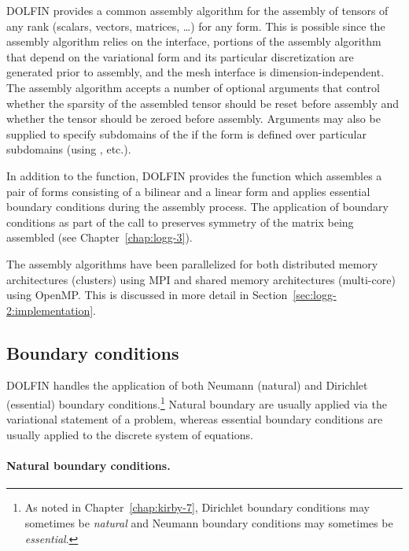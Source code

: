 DOLFIN provides a common assembly algorithm for the assembly of tensors
of any rank (scalars, vectors, matrices, \ldots) for any form. This is
possible since the assembly algorithm relies on the 
interface, portions of the assembly algorithm that depend on the
variational form and its particular discretization are generated prior to
assembly, and the mesh interface is dimension-independent.  The assembly
algorithm accepts a number of optional arguments that control whether
the sparsity of the assembled tensor should be reset before assembly
and whether the tensor should be zeroed before assembly. Arguments may
also be supplied to specify subdomains of the  if the form is
defined over particular subdomains (using ,  etc.).

In addition to the  function, DOLFIN provides the
 function which assembles a pair of forms
consisting of a bilinear and a linear form and applies essential
boundary conditions during the assembly process. The application of
boundary conditions as part of the call to 
preserves symmetry of the matrix being assembled (see
Chapter~\ref{chap:logg-3}).

The assembly algorithms have been parallelized for both distributed
memory architectures (clusters) using MPI and shared memory
architectures (multi-core) using OpenMP. This is discussed in more detail in
Section~\ref{sec:logg-2:implementation}.

\subsection{Boundary conditions}

DOLFIN handles the application of both Neumann (natural) and Dirichlet
(essential) boundary conditions.\footnote{As noted in
  Chapter~\ref{chap:kirby-7}, Dirichlet boundary conditions may
  sometimes be \emph{natural} and Neumann boundary conditions may
  sometimes be \emph{essential}.} Natural boundary are usually applied
via the variational statement of a problem, whereas essential boundary
conditions are usually applied to the discrete system of equations.

\paragraph{Natural boundary conditions.}


